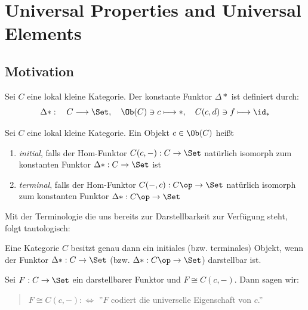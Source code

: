 \documentclass[11pt]{article}
\begin{document}
\newpage

\section{Universal Properties and Universal Elements}

\subsection{Motivation}
\begin{definition} 
Sei $C$ eine lokal kleine Kategorie. Der konstante Funktor $\Delta*$ ist definiert durch:
$$ \Delta*: \quad C\longrightarrow \Set, \quad \Ob(C)\ni c\longmapsto *,\quad C(c,d)\ni f \longmapsto \id_*$$
    
\end{definition}
\begin{definition} 
    Sei $C$ eine lokal kleine Kategorie. Ein Objekt $c\in \Ob(C)$ heißt 
    \begin{enumerate}[label=(\roman*)]
        \item \emph{initial}, falls der Hom-Funktor $C(c,-): C\to \Set$ natürlich isomorph zum konstanten Funktor $\Delta*: C\to \Set$ ist
        \item \emph{terminal}, falls der Hom-Funktor $C(-,c): C\op \to \Set$ natürlich isomorph zum konstanten Funktor $\Delta*: C\op\to \Set$
    \end{enumerate}
\end{definition}

Mit der Terminologie die uns bereits zur Darstellbarkeit zur Verfügung steht, folgt tautologisch:

\begin{corollary}
    Eine Kategorie $C$ besitzt genau dann ein initiales (bzw. terminales) Objekt, wenn der Funktor $\Delta*: C\to \Set$ (bzw. $\Delta*: C\op \to \Set$) darstellbar ist.
\end{corollary}

\begin{definition} 
    Sei $F: C\to \Set$ ein darstellbarer Funktor und $F\cong C(c,-)$. Dann sagen wir:
    \begin{quote}
        $F\cong C(c,-):\Longleftrightarrow$ ''$F$ codiert die universelle Eigenschaft von $c$.''
    \end{quote}
\end{definition}
\end{document}
